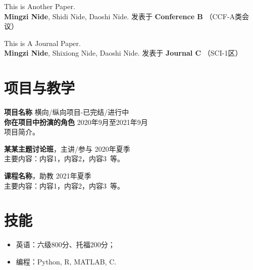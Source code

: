     \vspace{0.5em}
    This is Another Paper. \\
    \textbf{Mingzi Nide}, Shidi Nide, Daoshi Nide. \hfill 
    发表于 \textbf{Conference B} （CCF-A类会议）

    \vspace{0.5em}
    This is A Journal Paper.\\
    \textbf{Mingzi Nide}, Shixiong Nide, Daoshi Nide. \hfill 
    发表于 \textbf{Journal C} （SCI-1区）

    \section{\makebox[\widthof{\faChalkboardTeacher}][c]{\color{TJU_Blue}{\faChalkboardTeacher}}\quad 项目与教学}
    \vspace{0.5em}
    {\large{\textbf{项目名称}}} \hfill {横向/纵向项目-已完结/进行中}\\
    \textbf{你在项目中扮演的角色} \hfill 2020年9月至2021年9月\\
    项目简介。

    \vspace{1em}
    {\large{\textbf{某某主题讨论班}}}，主讲/参与 \hfill {2020年夏季}\\
    主要内容：内容1，内容2，内容3\ 等。
    
    \vspace{1em}
    {\large{\textbf{课程名称}}}，助教 \hfill {2021年夏季}\\
    主要内容：内容1，内容2，内容3\ 等。

    \section{\makebox[\widthof{\faWrench}][c]{\color{TJU_Blue}{\faWrench}}\quad 技能}
    \vspace{0.5em}
    \begin{itemize}
        \item 英语：六级800分、托福200分；
        \item 编程：Python, R, MATLAB, C.
    \end{itemize}
    

    
